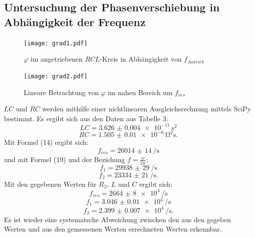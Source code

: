 \subsection{Untersuchung der Phasenverschiebung in Abhängigkeit der Frequenz}
\begin{figure}[H]
	\centering
	\caption{$\varphi$ im angetriebenen $RCL$-Kreis in Abhängigkeit von $f_{Antrieb}$ }
	\texttt{[image: grad1.pdf]}
	\label{fig:grad1}
\end{figure}
\begin{figure}[H]
	\centering
	\caption{Lineare Betrachtung von $\varphi$ im nahen Bereich um $f_{res}$}
	\texttt{[image: grad2.pdf]}
	\label{fig:grad2}
\end{figure}

$LC$ und $RC$ werden mithilfe einer nichtlinearen Ausgleichsrechnung mittels SciPy \cite{scipy} bestimmt. Es ergibt sich aus den Daten aus Tabelle 3:
\begin{displaymath}
LC = \SI{3.626(4)e-11}{\second\squared}
\end{displaymath}
\begin{displaymath}
RC = \SI{1.505(10)e-6}{\ohm\squared\second}\text{.}
\end{displaymath}
Mit Formel (14) ergibt sich:
\begin{displaymath}
f_{res} = \SI{26014(14)}{\per\second}
\end{displaymath}
und mit Formel (19) und der Beziehung $f = \frac{\omega}{2\pi}$:
\begin{displaymath}
f_1 = \SI{29938(29)}{\per\second}
\end{displaymath}
\begin{displaymath}
f_2 = \SI{23334(21)}{\per\second}\text{.}
\end{displaymath}
Mit den gegebenen Werten für $R_2$, $L$ und $C$ ergibt sich:
\begin{displaymath}
f_{res} = \SI{2664(8)e4}{\per\second}
\end{displaymath}
\begin{displaymath}
f_1 = \SI{3.046(10)e4}{\per\second}
\end{displaymath}
\begin{displaymath}
f_2 = \SI{2.399(7)e4}{\per\second}\text{.}
\end{displaymath}
Es ist wieder eine systematsche Abweichung zwischen den aus den gegeben Werten und aus den gemessenen Werten errechneten Werten erkennbar.


